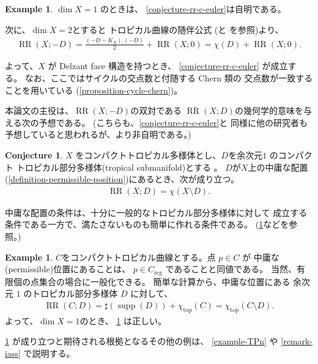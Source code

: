 \documentclass[a4paper,dvipdfmx,reqno,12pt]{amsart}
\theoremstyle{definition}
\newtheorem{example}[theorem]{Example}
\newtheorem{conjecture}[theorem]{Conjecture}
\newcommand{\opn}[1]{\operatorname{#1}}
\numberwithin{equation}{section}
\begin{document}
\begin{example}
$\dim X=1$ のときは、
\cref{conjecture-rr-c-euler}は自明である。

次に、$\dim X=2$とすると
トロピカル曲線の随伴公式
(\cite[Theorem 6]{shaw2015tropical}と
\cite[Theorem 5.2]{demedrano2023chern}を参照)より、
\begin{align}
\opn{RR}(X;-D)=\frac{(-D-K_X).(-D)}{2}+\opn{RR}(X;0)
=\chi(D)+\opn{RR}(X;0).
\end{align}

よって、$X$ が Delzant face 構造を持つとき、
\cref{conjecture-rr-c-euler} が成立する。
なお、ここではサイクルの交点数と付随する Chern 類の
交点数が一致することを用いている
(\cref{proposition-cycle-chern})。
\end{example}
本論文の主役は、$\opn{RR}(X;-D)$の双対である
$\opn{RR}(X;D)$の幾何学的意味を与える次の予想である。
(こちらも、\cref{conjecture-rr-c-euler}と
同様に他の研究者も予想していると思われるが、より非自明である。)
\begin{conjecture}
\label{conjecture-rr-euler}
$X$ をコンパクトトロピカル多様体とし、$D$を余次元$1$
のコンパクト
トロピカル部分多様体(tropical submanifold)とする
\cite[Definition 2.14]{demedrano2023chern}。
$D$が$X$上の中庸な配置
(\cref{definition-permissible-position})にあるとき、次が成り立つ。
\begin{align}
\opn{RR}(X;D)=\chi(X\setminus D).
\end{align}
\end{conjecture}

中庸な配置の条件は、十分に一般的なトロピカル部分多様体に対して
成立する条件である一方で、満たさないものも簡単に作れる条件である。
(\cref{example-permissible-point}などを参照。)

\begin{example}
\label{example-permissible-point}
$C$をコンパクトトロピカル曲線とする。点 $p\in C$ が
中庸な(permissible)位置にあることは、
$p\in C_{\opn{reg}}$ であることと同値である。
当然、有限個の点集合の場合に一般化できる。
簡単な計算から、中庸な位置にある
余次元 $1$ のトロピカル部分多様体
$D$ に対して、
\begin{align}
\opn{RR}(C;D)=\sharp (\opn{supp}(D))+ \chi_{\opn{top}}(C)
=\chi_{\opn{top}}(C\setminus D).
\end{align}
よって、$\dim X=1$のとき、
\cref{conjecture-rr-euler}
は正しい。
\end{example}

\cref{conjecture-rr-euler}
が成り立つと期待される根拠となるその他の例は、
\cref{example-TPn} や
\cref{remark-iass} で説明する。
\end{document}
